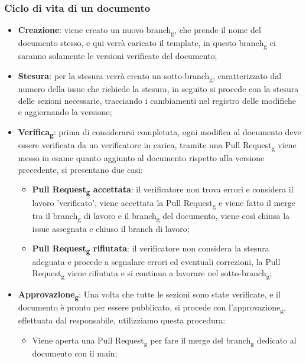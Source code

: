         \subsubsection{Ciclo di vita di un documento}
        \begin{itemize}
            \item \textbf{Creazione}: viene creato un nuovo branch\textsubscript{g}, che prende il nome del documento stesso, e qui verrà caricato il template, in questo branch\textsubscript{g} ci saranno solamente le versioni verificate del documento;
            \item \textbf{Stesura}: per la stesura verrà creato un sotto-branch\textsubscript{g}, caratterizzato dal numero della issue che richiede la stesura, in seguito si procede con la stesura delle sezioni necessarie, tracciando i cambiamenti nel registro delle modifiche e aggiornando la versione;
            \item \textbf{Verifica\textsubscript{g}}: prima di considerarsi completata, ogni modifica al documento deve essere verificata da un verificatore in carica, tramite una Pull Request\textsubscript{g} viene messo in esame quanto aggiunto al documento rispetto alla versione precedente, si presentano due casi:
            \begin{itemize}
                \item \textbf{Pull Request\textsubscript{g} accettata}: il verificatore non trova errori e considera il lavoro 'verificato', viene accettata la Pull Request\textsubscript{g} e viene fatto il merge tra il branch\textsubscript{g} di lavoro e il branch\textsubscript{g} del documento, viene così chiusa la issue assegnata e chiuso il branch di lavoro;
                \item \textbf{Pull Request\textsubscript{g} rifiutata}: il verificatore non considera la stesura adeguata e procede a segnalare errori ed eventuali correzioni, la Pull Request\textsubscript{g} viene rifiutata e si continua a lavorare nel sotto-branch\textsubscript{g};
            \end{itemize}
            \item \textbf{Approvazione\textsubscript{g}}: Una volta che tutte le sezioni sono state verificate, e il documento è pronto per essere pubblicato, si procede con l'approvazione\textsubscript{g}, effettuata dal responsabile, utilizziamo questa procedura:
            \begin{itemize}
                \item Viene aperta una Pull Request\textsubscript{g} per fare il merge del branch\textsubscript{g} dedicato al documento con il main;

\end{itemize}
\end{itemize}
